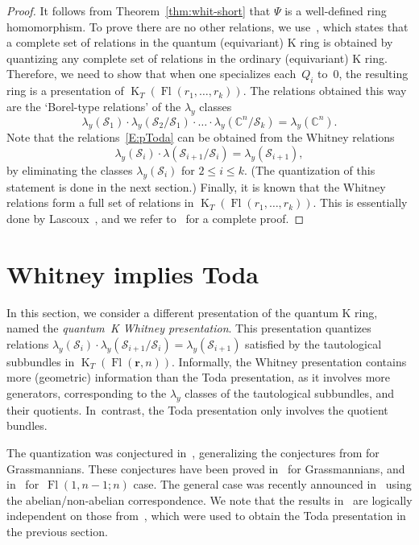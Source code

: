 \documentclass[11pt]{article}
\numberwithin{equation}{section}
\numberwithin{equation}{section}
\theoremstyle{definition}
\DeclareMathOperator{\Fl}{Fl}
\DeclareMathOperator{\K}{K}
\newcommand{\bfr}{{\mathbf r}}
\newcommand{\C}{{\mathbb C}}
\newcommand{\cS}{{\mathcal S}}
\begin{document}
\begin{proof}
It follows from Theorem~\ref{thm:whit-short} that $\Psi$ is a well-defined ring homomorphism.
To prove there are no other relations, we use~\cite[Theorem~4.1]{GMSXZZ:Nakayama}, which
states that a complete set of relations in the quantum (equivariant) K ring is
obtained by quantizing any complete set of relations in the ordinary (equivariant) K ring.
Therefore, we need to show that when one specializes each~$Q_i$ to~$0$, the resulting
ring is a presentation of $\K_T(\Fl(r_1,\dots,r_k))$.
The relations obtained this way
are the `Borel-type relations' of the $\lambda_y$ classes
\begin{equation}\label{E:pToda} \lambda_y(\cS_1) \cdot \lambda_y(\cS_2/\cS_1)\cdot \dots \cdot \lambda_y(\C^n/\cS_k) = \lambda_y(\C^n) . \end{equation}
Note that the relations~\eqref{E:pToda} can be obtained from the Whitney relations
\[ \lambda_y(\cS_i) \cdot \lambda(\cS_{i+1}/\cS_i) = \lambda_y(\cS_{i+1}) , \]
by eliminating the classes $\lambda_y(\cS_i)$ for $2 \le i \le k$.
(The quantization of this statement is done in the next section.)
Finally, it is known that
the Whitney relations form a full set of relations
in $\K_T(\Fl(r_1,\dots,r_k))$. This is essentially done by Lascoux~\cite[Section~7]{lascoux:anneau},
and we refer to~\cite[Proposition~5.1]{GMSXZZ:Nakayama} for a complete proof.
\end{proof}


\section{Whitney implies Toda}\label{sec:whitney}
In this section, we consider a different presentation of the quantum K ring, named the
{\em quantum~K Whitney presentation}.
This presentation quantizes
 relations $\lambda_y(\cS_i) \cdot \lambda_y(\cS_{i+1}/\cS_i) = \lambda_y(\cS_{i+1})$
 satisfied by the tautological subbundles in $\K_T(\Fl(\bfr,n))$. Informally, the
 Whitney presentation contains more (geometric) information than the Toda presentation,
 as it involves more generators, corresponding to the $\lambda_y$
 classes of the tautological subbundles, and their quotients. In~contrast, the Toda presentation
 only involves the quotient bundles.




The quantization was conjectured in~\cite{gu2023quantum,GMSXZZ:QKW},
generalizing the conjectures from
\cite{Gu:2020zpg} for Grassmannians. These conjectures have been proved in~\cite{gu2022quantum}
for Grassmannians, and in~\cite{GMSXZZ:QKW} for~$\Fl(1,n-1;n)$ case. The general case was recently announced in~\cite{huq2024quantum} using the abelian/non-abelian correspondence.
We note that the results in~\cite{huq2024quantum} are logically independent on those from~\cite{maeno2023presentation}, which were used to obtain the Toda presentation in the previous section.
\end{document}
